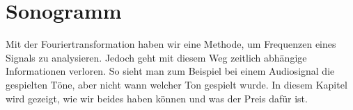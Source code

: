 %
%
%
%
\chapter{Sonogramm\label{chapter:sonogramm}}
\begin{refsection}

Mit der Fouriertransformation haben wir eine Methode, um Frequenzen eines Signals zu analysieren.
Jedoch geht mit diesem Weg zeitlich abhängige Informationen verloren.
So sieht man zum Beispiel bei einem Audiosignal die gespielten Töne, aber nicht wann welcher Ton gespielt wurde.
In diesem Kapitel wird gezeigt, wie wir beides haben können und was der Preis dafür ist.







\printbibliography[heading=subbibliography]
\end{refsection}
